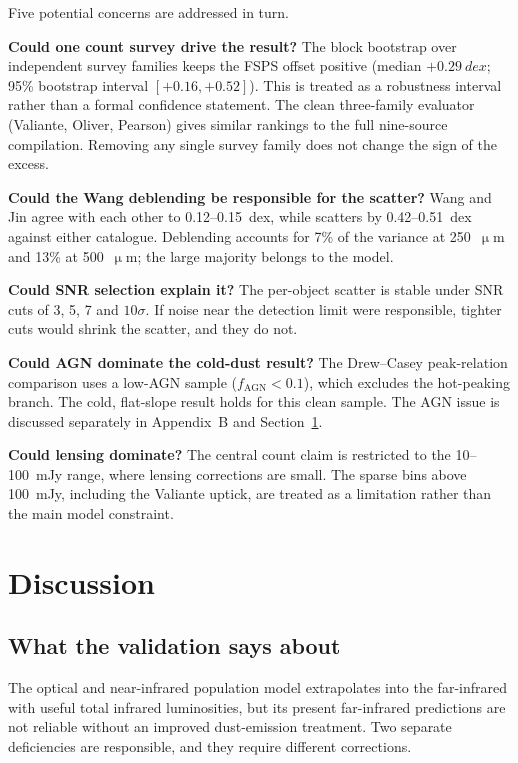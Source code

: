 \documentclass[12pt,a4paper]{article}
\begin{document}
Five potential concerns are addressed in turn.

\textbf{Could one count survey drive the result?} The block bootstrap over independent
survey families keeps the FSPS offset positive (median $+\SI{0.29}{dex}$; 95\%
bootstrap interval $[+0.16,+0.52]$). This is treated as a robustness interval rather
than a formal confidence statement. The clean three-family evaluator
(Valiante, Oliver, Pearson) gives similar rankings to the full nine-source compilation.
Removing any single survey family does not change the sign of the excess.

\textbf{Could the Wang deblending be responsible for the scatter?} Wang and Jin agree
with each other to 0.12--\SI{0.15}{dex}, while \popcosmos{} scatters by
0.42--\SI{0.51}{dex} against either catalogue. Deblending accounts for 7\% of the
variance at 250~$\upmu$m and 13\% at 500~$\upmu$m; the large majority belongs to the
model.

\textbf{Could SNR selection explain it?} The per-object scatter is stable under SNR
cuts of 3, 5, 7 and $10\sigma$. If noise near the detection limit were responsible,
tighter cuts would shrink the scatter, and they do not.

\textbf{Could AGN dominate the cold-dust result?} The Drew--Casey peak-relation
comparison uses a low-AGN sample ($f_\mathrm{AGN} < 0.1$), which excludes the
hot-peaking branch. The cold, flat-slope result holds for this clean sample. The AGN
issue is discussed separately in Appendix~B and Section~\ref{sec:discussion}.

\textbf{Could lensing dominate?} The central count claim is restricted to the
10--\SI{100}{mJy} range, where lensing corrections are small. The sparse bins above
\SI{100}{mJy}, including the Valiante uptick, are treated as a limitation rather than
the main model constraint.

\section{Discussion}
\label{sec:discussion}

\subsection{What the validation says about \popcosmos{}}
\label{sec:discussion:summary}

The optical and near-infrared population model extrapolates into the far-infrared with
useful total infrared luminosities, but its present far-infrared predictions are not
reliable without an improved dust-emission treatment. Two separate deficiencies are
responsible, and they require different corrections.
\end{document}
